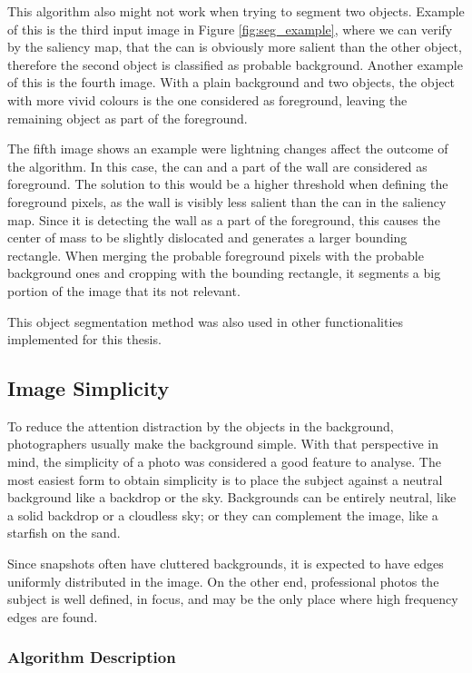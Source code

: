 This algorithm also might not work when trying to segment two objects. Example of this is the third input image in Figure \ref{fig:seg_example}, where we can verify by the saliency map, that the can is obviously more salient than the other object, therefore the second object is classified as probable background. Another example of this is the fourth image. With a plain background and two objects, the object with more vivid colours is the one considered as foreground, leaving the remaining object as part of the foreground.

The fifth image shows an example were lightning changes affect the outcome of the algorithm. In this case, the can and a part of the wall are considered as foreground. The solution to this would be a higher threshold when defining the foreground pixels, as the wall is visibly less salient than the can in the saliency map. Since it is detecting the wall as a part of the foreground, this causes the center of mass to be slightly dislocated and generates a larger bounding rectangle. When merging the probable foreground pixels with the probable background ones and cropping with the bounding rectangle, it segments a big portion of the image that its not relevant.

This object segmentation method was also used in other functionalities implemented for this thesis.

\subsection{Image Simplicity}
\label{sub:background}

To reduce the attention distraction by the objects in the background, photographers usually make the background simple. With that perspective in mind, the simplicity of a photo was considered a good feature to analyse.
The most easiest form to obtain simplicity is to place the subject against a neutral background like a backdrop or the sky. Backgrounds can be entirely neutral, like a solid backdrop or a cloudless sky; or they can complement the image, like a starfish on the sand.

Since snapshots often have cluttered backgrounds, it is expected to have edges uniformly distributed in the image. On the other end, professional photos the subject is well defined, in focus, and may be the only place where high frequency edges are found.

\subsubsection{Algorithm Description}

